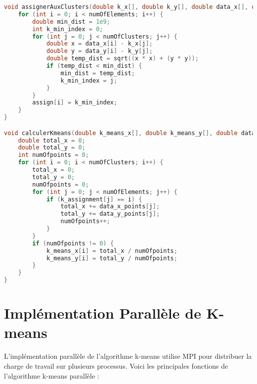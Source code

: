 \documentclass{article}
\begin{document}
\begin{lstlisting}[language=C, caption=Principales fonctions de l'algorithme k-means séquentiel]
void assignerAuxClusters(double k_x[], double k_y[], double data_x[], double data_y[], int assign[], int numOfElements, int numOfClusters) {
    for (int i = 0; i < numOfElements; i++) {
        double min_dist = 1e9;
        int k_min_index = 0;
        for (int j = 0; j < numOfClusters; j++) {
            double x = data_x[i] - k_x[j];
            double y = data_y[i] - k_y[j];
            double temp_dist = sqrt((x * x) + (y * y));
            if (temp_dist < min_dist) {
                min_dist = temp_dist;
                k_min_index = j;
            }
        }
        assign[i] = k_min_index;
    }
}

void calculerKmeans(double k_means_x[], double k_means_y[], double data_x_points[], double data_y_points[], int k_assignment[], int numOfElements, int numOfClusters) {
    double total_x = 0;
    double total_y = 0;
    int numOfpoints = 0;
    for (int i = 0; i < numOfClusters; i++) {
        total_x = 0;
        total_y = 0;
        numOfpoints = 0;
        for (int j = 0; j < numOfElements; j++) {
            if (k_assignment[j] == i) {
                total_x += data_x_points[j];
                total_y += data_y_points[j];
                numOfpoints++;
            }
        }
        if (numOfpoints != 0) {
            k_means_x[i] = total_x / numOfpoints;
            k_means_y[i] = total_y / numOfpoints;
        }
    }
}
\end{lstlisting}

\section{Implémentation Parallèle de K-means}
L'implémentation parallèle de l'algorithme k-means utilise MPI pour distribuer la charge de travail sur plusieurs processus. Voici les principales fonctions de l'algorithme k-means parallèle :
\end{document}
